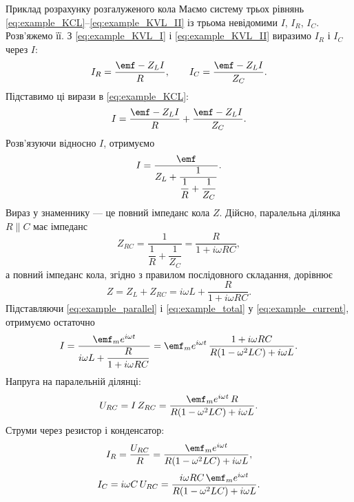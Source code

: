 \begin{Example}{Приклад розрахунку розгалуженого кола}
Маємо систему трьох рівнянь \eqref{eq:example_KCL}--\eqref{eq:example_KVL_II} із трьома невідомими $I$, $I_R$, $I_C$. Розв'яжемо її. З \eqref{eq:example_KVL_I} і \eqref{eq:example_KVL_II} виразимо $I_R$ і $I_C$ через $I$:
\begin{equation*}
	I_R = \frac{\emf - Z_L I}{R}, \qquad
	I_C = \frac{\emf - Z_L I}{Z_C}.
\end{equation*}
Підставимо ці вирази в \eqref{eq:example_KCL}:
\begin{equation*}
	I = \frac{\emf - Z_L I}{R} + \frac{\emf - Z_L I}{Z_C}.
\end{equation*}
Розв'язуючи відносно $I$, отримуємо
\begin{equation}\label{eq:example_current}
	I = \frac{\emf}{Z_L + \dfrac{1}{\dfrac{1}{R} + \dfrac{1}{Z_C}}}.
\end{equation}
Вираз у знаменнику --- це повний імпеданс кола $Z$. Дійсно, паралельна ділянка $R \parallel C$ має імпеданс
\begin{equation}\label{eq:example_parallel}
	Z_{RC} = \frac{1}{\dfrac{1}{R} + \dfrac{1}{Z_C}} = \frac{R}{1 + i\omega RC},
\end{equation}
а повний імпеданс кола, згідно з правилом послідовного складання, дорівнює
\begin{equation}\label{eq:example_total}
	Z = Z_L + Z_{RC} = i\omega L + \frac{R}{1 + i\omega RC}.
\end{equation}
Підставляючи \eqref{eq:example_parallel} і \eqref{eq:example_total} у \eqref{eq:example_current}, отримуємо остаточно
\begin{equation}\label{eq:example_current_explicit}
	I = \frac{\emf_m e^{i\omega t}}{i\omega L + \dfrac{R}{1 + i\omega RC}}
	  = \emf_m e^{i\omega t}\,\frac{1 + i\omega RC}{R(1 - \omega^2 LC) + i\omega L}.
\end{equation}
Напруга на паралельній ділянці:
\begin{equation*}
	U_{RC} = I\,Z_{RC}
	       = \frac{\emf_m e^{i\omega t}\,R}{R(1 - \omega^2 LC) + i\omega L}.
\end{equation*}
Струми через резистор і конденсатор:
\begin{equation*}
	I_R = \frac{U_{RC}}{R} = \frac{\emf_m e^{i\omega t}}{R(1 - \omega^2 LC) + i\omega L},
\end{equation*}
\begin{equation*}
	I_C = i\omega C\,U_{RC} = \frac{i\omega RC\,\emf_m e^{i\omega t}}{R(1 - \omega^2 LC) + i\omega L}.
\end{equation*}


\end{Example}
